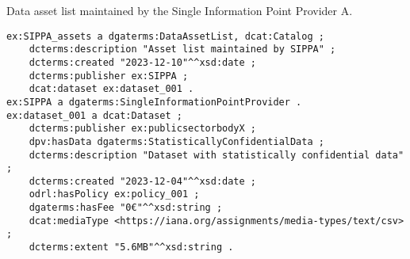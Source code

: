 \begin{listing}[ht]
\caption{Data asset list maintained by the Single Information Point Provider A.}
\label{list:data_asset_list}
\begin{verbatim}
ex:SIPPA_assets a dgaterms:DataAssetList, dcat:Catalog ;
    dcterms:description "Asset list maintained by SIPPA" ;
    dcterms:created "2023-12-10"^^xsd:date ;
    dcterms:publisher ex:SIPPA ;
    dcat:dataset ex:dataset_001 .
ex:SIPPA a dgaterms:SingleInformationPointProvider .
ex:dataset_001 a dcat:Dataset ;
    dcterms:publisher ex:publicsectorbodyX ;
    dpv:hasData dgaterms:StatisticallyConfidentialData ;
    dcterms:description "Dataset with statistically confidential data" ;
    dcterms:created "2023-12-04"^^xsd:date ; 
    odrl:hasPolicy ex:policy_001 ;
    dgaterms:hasFee "0€"^^xsd:string ;
    dcat:mediaType <https://iana.org/assignments/media-types/text/csv> ;
    dcterms:extent "5.6MB"^^xsd:string .
\end{verbatim}
\end{listing}


